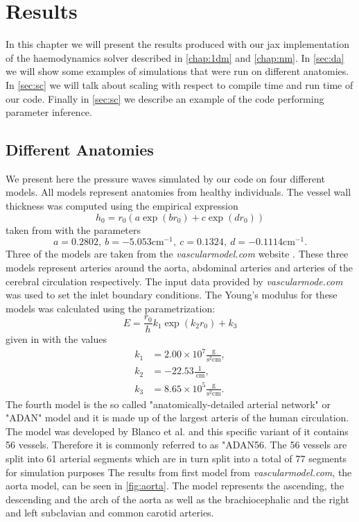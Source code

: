 \documentclass[a4paper, oneside]{discothesis}
\begin{document}
\chapter{Results}
In this chapter we will present the results produced with our jax implementation of the haemodynamics solver described in \autoref{chap:1dm} and \autoref{chap:nm}. 
In \autoref{sec:da} we will show some examples of simulations that were run on different anatomies.
In \autoref{sec:sc} we will talk about scaling with respect to compile time and run time of our code.
Finally in \autoref{sec:sc} we describe an example of the code performing parameter inference.
\section{Different Anatomies} \label{sec:da}
We present here the pressure waves simulated by our code on four different models.
All models represent anatomies from healthy individuals.
The vessel wall thickness was computed using the empirical expression
\begin{equation}
	h_0 = r_0 \left(a \exp(b r_0) + c \exp(d r_0)\right)
\end{equation}
taken from \cite{blanco2014anatomically} with the parameters
\begin{equation}
a = 0.2802, \ b = -5.053 \text{cm}^{-1}, \ c = 0.1324,\  d = -0.1114 \text{cm}^{-1}.
\end{equation}
Three of the models are taken from the \emph{vascularmodel.com} website \cite{vascularmodel}.
These three models represent arteries around the aorta, abdominal arteries and arteries of the cerebral circulation respectively.
The input data provided by \emph{vascularmode.com} was used to set the inlet boundary conditions.
The Young's modulus for these models was calculated using the parametrization:
\begin{equation}
	E = \frac{r_0}{h} k_1 \exp(k_2 r_0) + k_3
\end{equation}
given in \cite{ottesen2004applied} with the values
\begin{align}
	k_1 &= 2.00 \times 10^7 \frac{\text{g}}{\text{s}^2\text{cm}}, \\
	k_2 &= -22.53 \frac{1}{\ \text{cm}}, \\
	k_3 &= 8.65 \times 10^5 \frac{\text{g}}{\text{s}^2\text{cm}}.
\end{align}
The fourth model is the so called "anatomically-detailed arterial network" or "ADAN" model and it is made up of the largest arteris of the human circulation.
The model was developed by Blanco et al. \cite{blanco2014anatomically,blanco2014blood} and this specific variant of it contains 56 vessels.
Therefore it is commonly referred to as "ADAN56.
The 56 vessels are split into 61 arterial segments which are in turn split into a total of 77 segments for simulation purposes 
The results from first model from \emph{vascularmodel.com}, the aorta model, can be seen in \autoref{fig:aorta}.
The model represents the ascending, the descending and the arch of the aorta as well as the brachiocephalic and the right and left subclavian and common carotid arteries.
\end{document}
